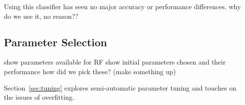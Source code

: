 Using this classifier has seen no major accuracy or performance differences.
why do we use it, no reason??

\subsection{Parameter Selection}
show parameters available for RF
show initial parameters chosen and their performance
how did we pick these? (make something up)

Section~\ref{sec:tuning} explores semi-automatic parameter tuning and touches on
the issues of overfitting.
